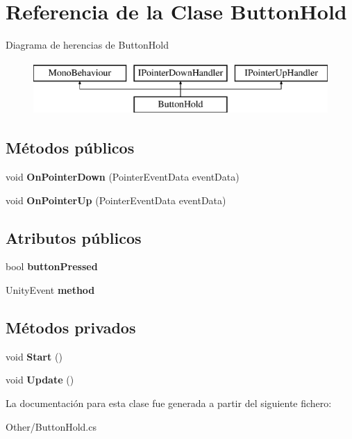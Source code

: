 \hypertarget{class_button_hold}{}\section{Referencia de la Clase Button\+Hold}
\label{class_button_hold}
Diagrama de herencias de Button\+Hold\begin{figure}[H]
\begin{center}
\leavevmode
\includegraphics[height=2.000000cm]{class_button_hold}
\end{center}
\end{figure}
\subsection*{Métodos públicos}
\begin{DoxyCompactItemize}
\item 
\mbox{\label{class_button_hold_a2e1f8ebf88714ea3e86261ef811c9941}} 
void {\bfseries On\+Pointer\+Down} (Pointer\+Event\+Data event\+Data)
\item 
\mbox{\label{class_button_hold_a2512c68bf1ec55d4bae22da5ef7ed66a}} 
void {\bfseries On\+Pointer\+Up} (Pointer\+Event\+Data event\+Data)
\end{DoxyCompactItemize}
\subsection*{Atributos públicos}
\begin{DoxyCompactItemize}
\item 
\mbox{\label{class_button_hold_a9855cab98cfb77aee35a1cf117be20ef}} 
bool {\bfseries button\+Pressed}
\item 
\mbox{\label{class_button_hold_a45f8cc4d6c22a20d71717b00d3087fd4}} 
Unity\+Event {\bfseries method}
\end{DoxyCompactItemize}
\subsection*{Métodos privados}
\begin{DoxyCompactItemize}
\item 
\mbox{\label{class_button_hold_a66c2a898edb4d75f86c07ddd09b2b433}} 
void {\bfseries Start} ()
\item 
\mbox{\label{class_button_hold_ae908d18846152daca9782466469ea79d}} 
void {\bfseries Update} ()
\end{DoxyCompactItemize}


La documentación para esta clase fue generada a partir del siguiente fichero\+:\begin{DoxyCompactItemize}
\item 
Other/Button\+Hold.\+cs\end{DoxyCompactItemize}
